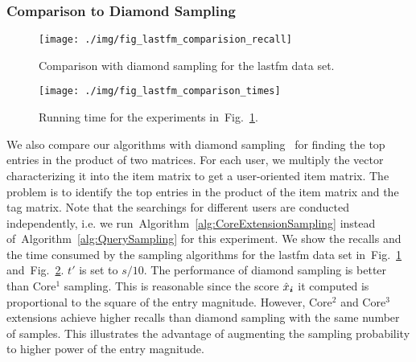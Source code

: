 \documentclass[10pt,journal,compsoc]{IEEEtran}
\newcommand{\V}[1]{{\boldsymbol{{\MakeLowercase{#1}}}}}
\newcommand{\Fig}[1]{Fig.~\ref{fig:#1}}
\newcommand{\Alg}[1]{Algorithm~\ref{alg:#1}}
\begin{document}
\subsubsection{Comparison to Diamond Sampling}
\begin{figure}[!ht]
	\centering
	\texttt{[image: ./img/fig\_lastfm\_comparision\_recall]}\\
	\caption{Comparison with diamond sampling for the lastfm data set.}
	\label{fig:Comparison_recall}
\end{figure}
\begin{figure}[!ht]
	\centering
	\texttt{[image: ./img/fig\_lastfm\_comparison\_times]}\\
	\caption{Running time for the experiments in~\Fig{Comparison_recall}.}
	\label{fig:Comparison_time}
\end{figure}
We also compare our algorithms with diamond sampling~\cite{BaPiKoSe15}
for finding the top entries in the product of two matrices.
For each user, we multiply the vector characterizing it into the item matrix
to get a user-oriented item matrix.
The problem is to identify the top entries in the product of the item matrix and the tag matrix.
Note that the searchings for different users are conducted independently,
i.e. we run~\Alg{CoreExtensionSampling} instead of~\Alg{QuerySampling} for this experiment.
We show the recalls and the time consumed by the sampling algorithms for the lastfm data set
in~\Fig{Comparison_recall} and~\Fig{Comparison_time}.
$t'$ is set to $s/10$.
The performance of diamond sampling is better than Core$^1$ sampling.
This is reasonable since the score $\hat{x}_{\V{i}}$ it computed is proportional to the square of the entry magnitude.
However, Core$^2$ and Core$^3$ extensions achieve higher recalls than diamond sampling with the same number of samples.
This illustrates the advantage of augmenting the sampling probability to higher power of the entry magnitude.
\end{document}
